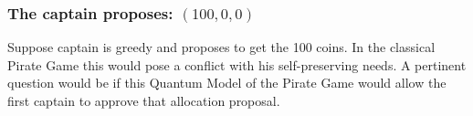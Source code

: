 \subsubsection{The captain proposes: $(100, 0, 0)$}
\label{subsubsec:3playergame100}

Suppose captain is greedy and proposes to get the 100 coins. In the classical Pirate Game this would pose a conflict with his self-preserving needs. 
A pertinent question would be if this Quantum Model of the Pirate Game would allow the first captain to approve that allocation proposal. 

